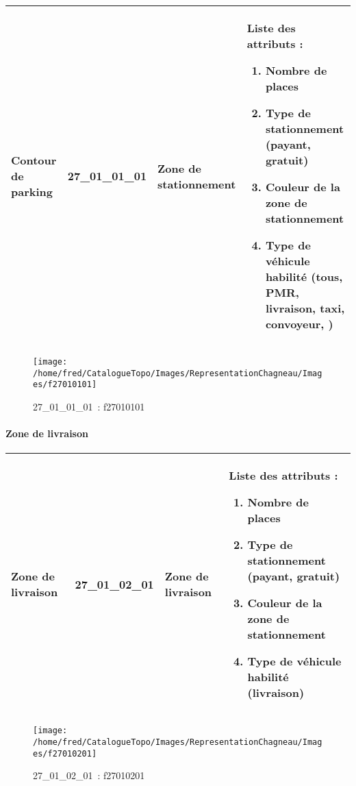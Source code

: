 \documentclass[12pt,titlepage]{book}
\begin{document}
\renewcommand{\arraystretch}{1.2}
\begin{supertabular}{|p{10cm}|c|p{13cm}|p{12cm}|}
 Contour de parking & 27\_01\_01\_01 & Zone de stationnement & Liste des attributs :
\begin{enumerate}
  \item Nombre de places  \item Type de stationnement (payant, gratuit)  \item Couleur de la zone de stationnement  \item Type de véhicule habilité (tous, PMR, livraison, taxi, convoyeur, )\end{enumerate}
\\
\hline
\end{supertabular}
\begin{figure}[h!]
  \hfill         %
  \begin{minipage}[t]{3cm}
    \begin{center}
      \texttt{[image: /home/fred/CatalogueTopo/Images/RepresentationChagneau/Images/f27010101]}
      \caption[~27\_01\_01\_01]{\small{27\_01\_01\_01~:} \tiny{f27010101}}\label{f27010101}
    \end{center}
  \end{minipage}
\end{figure}


\paragraph{Zone de livraison}
\noindent
\vspace{\baselineskip}

\renewcommand{\arraystretch}{1.2}
\begin{supertabular}{|p{10cm}|c|p{13cm}|p{12cm}|}
 Zone de livraison & 27\_01\_02\_01 & Zone de livraison & Liste des attributs :
\begin{enumerate}
  \item Nombre de places  \item Type de stationnement (payant, gratuit)  \item Couleur de la zone de stationnement  \item Type de véhicule habilité (livraison)\end{enumerate}
\\
\hline
\end{supertabular}
\begin{figure}[h!]
  \hfill         %
  \begin{minipage}[t]{3cm}
    \begin{center}
      \texttt{[image: /home/fred/CatalogueTopo/Images/RepresentationChagneau/Images/f27010201]}
      \caption[~27\_01\_02\_01]{\small{27\_01\_02\_01~:} \tiny{f27010201}}\label{f27010201}
    \end{center}
  \end{minipage}
\end{figure}
\end{document}
